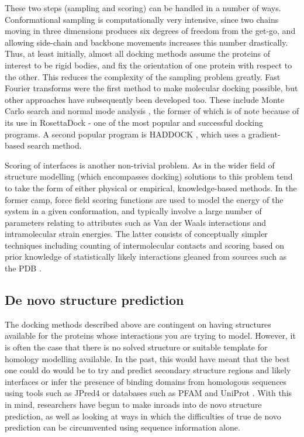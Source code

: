 \documentclass[a4paper,11pt,twoside,openright]{scrbook}
\begin{document}
These two steps (sampling and scoring) can be handled in a number of ways. Conformational sampling is computationally very intensive, since two chains moving in three dimensions produces six degrees of freedom from the get-go, and allowing side-chain and backbone movements increases this number drastically. Thus, at least initially, almost all docking methods assume the proteins of interest to be rigid bodies, and fix the orientation of one protein with respect to the other. This reduces the complexity of the sampling problem greatly. Fast Fourier transforms \cite{Katchalski-Katzir1992} were the first method to make molecular docking possible, but other approaches have subsequently been developed too. These include Monte Carlo search \cite{Hart1992} and normal mode analysis \cite{Zacharias2005}, the former of which is of note because of its use in RosettaDock \cite{Lyskov2008,Zhang2015} - one of the most popular and successful docking programs. A second popular program is HADDOCK \cite{Dominguez2003,VanZundert2016}, which uses a gradient-based search method.

Scoring of interfaces is another non-trivial problem. As in the wider field of structure modelling (which encompasses docking) solutions to this problem tend to take the form of either physical or empirical, knowledge-based methods. In the former camp, force field scoring functions \cite{Kynast2016} are used to model the energy of the system in a given conformation, and typically involve a large number of parameters relating to attributes such as Van der Waals interactions and intramolecular strain energies. The latter consists of conceptually simpler techniques including counting of intermolecular contacts and scoring based on prior knowledge of statistically likely interactions gleaned from sources such as the PDB \cite{Bohm1998,Sasse2017}.

\subsection{De novo structure prediction}
The docking methods described above are contingent on having structures available for the proteins whose interactions you are trying to model. However, it is often the case that there is no solved structure or suitable template for homology modelling available. In the past, this would have meant that the best one could do would be to try and predict secondary structure regions and likely interfaces or infer the presence of binding domains from homologous sequences using tools such as JPred4 \cite{Drozdetskiy2015} or databases such as PFAM and UniProt \cite{Finn2016,Consortium2017}. With this in mind, researchers have begun to make inroads into de novo structure prediction, as well as looking at ways in which the difficulties of true de novo prediction can be circumvented using sequence information alone.
\end{document}
